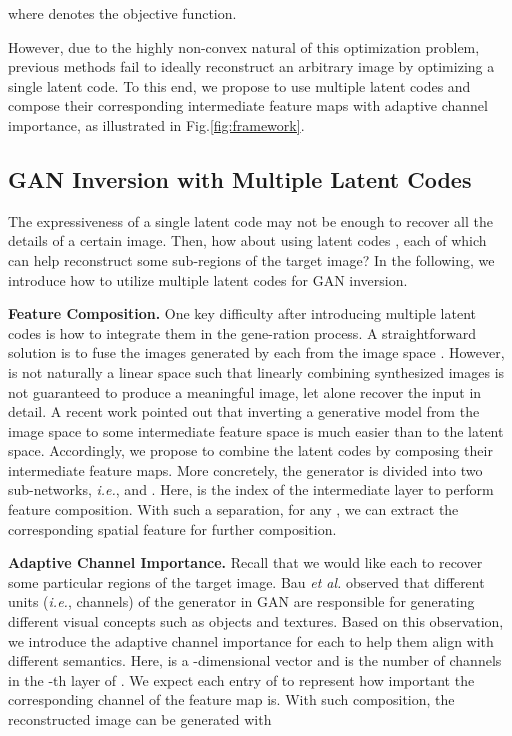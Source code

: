 \documentclass[10pt,twocolumn,letterpaper]{article}
\begin{document}
where  denotes the objective function.


However, due to the highly non-convex natural of this optimization problem, previous methods fail to ideally reconstruct an arbitrary image by optimizing a single latent code.
To this end, we propose to use multiple latent codes and compose their corresponding intermediate feature maps with adaptive channel importance, as illustrated in Fig.\ref{fig:framework}.


\subsection{GAN Inversion with Multiple Latent Codes}\label{subsec:gan-inversion-with-multiple-latent-codes}
The expressiveness of a single latent code may not be enough to recover all the details of a certain image.
Then, how about using  latent codes , each of which can help reconstruct some sub-regions of the target image?
In the following, we introduce how to utilize multiple latent codes for GAN inversion.


\vspace{2pt}\noindent\textbf{Feature Composition.}
One key difficulty after introducing multiple latent codes is how to integrate them in the gene-ration process.
A straightforward solution is to fuse the images generated by each  from the image space .
However,  is not naturally a linear space such that linearly combining synthesized images is not guaranteed to produce a meaningful image, let alone recover the input in detail.
A recent work \cite{inverting2019} pointed out that inverting a generative model from the image space to some intermediate feature space is much easier than to the latent space.
Accordingly, we propose to combine the latent codes by composing their intermediate feature maps.
More concretely, the generator  is divided into two sub-networks, \emph{i.e.},  and .
Here,  is the index of the intermediate layer to perform feature composition.
With such a separation, for any , we can extract the corresponding spatial feature  for further composition.


\vspace{2pt}\noindent\textbf{Adaptive Channel Importance.}
Recall that we would like each  to recover some particular regions of the target image.
Bau \emph{et al.} \cite{gandissection} observed that different units (\emph{i.e.}, channels) of the generator in GAN are responsible for generating different visual concepts such as objects and textures.
Based on this observation, we introduce the adaptive channel importance  for each  to help them align with different semantics.
Here,  is a -dimensional vector and  is the number of channels in the -th layer of .
We expect each entry of  to represent how important the corresponding channel of the feature map  is.
With such composition, the reconstructed image can be generated with
\end{document}

